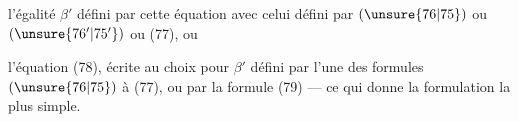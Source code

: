 l'égalité  $\beta'$ défini par cette équation avec celui défini par  $(\unsure{76|75})$ ou $(\unsure{76'|75'})$ ou (77), ou

l'équation (78), écrite au choix pour $\beta'$ défini par l'une des formules $(\unsure{76|75})$ à (77), ou par la formule (79) --- ce qui donne la formulation la plus simple.
